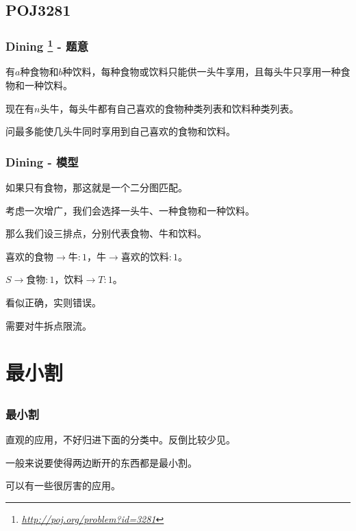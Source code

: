 \documentclass[9pt,dvipsnames,table]{beamer}
\newcommand{\hlink}[1]{
	\footnote{\fontsize{6pt}{\baselineskip}\href{#1}{\textsl{\underline{#1}}}}
}
\begin{document}
\subsection{POJ3281}
\begin{frame}
	\frametitle{Dining\hlink{http://poj.org/problem?id=3281} - 题意}
	有$a$种食物和$b$种饮料，每种食物或饮料只能供一头牛享用，且每头牛只享用一种食物和一种饮料。
	
	现在有$n$头牛，每头牛都有自己喜欢的食物种类列表和饮料种类列表。
	
	问最多能使几头牛同时享用到自己喜欢的食物和饮料。
\end{frame}
\begin{frame}
	\frametitle{Dining - 模型}
	如果只有食物，那这就是一个二分图匹配。\pause
	
	考虑一次增广，我们会选择一头牛、一种食物和一种饮料。
	
	那么我们设三排点，分别代表食物、牛和饮料。
	
	喜欢的食物$\rightarrow$牛$:1$，牛$\rightarrow$喜欢的饮料$:1$。
	
	$S\rightarrow$食物$:1$，饮料$\rightarrow T:1$。 \pause
	
	看似正确，实则错误。
	
	需要对牛拆点限流。
\end{frame}

\section[Model II]{最小割}
\subsection{}
\begin{frame}
	\frametitle{最小割}
	直观的应用，不好归进下面的分类中。反倒比较少见。
	
	一般来说要使得两边断开的东西都是最小割。
	
	可以有一些很厉害的应用。
\end{frame}
\end{document}

